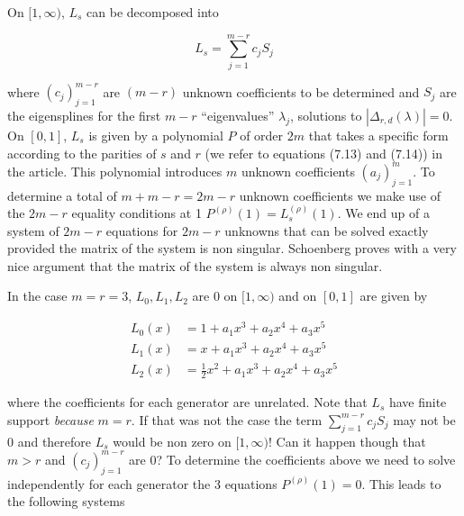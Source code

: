 \documentclass[a4paper, 11pt]{article}
\begin{document}
On $[1,\infty)$, $L_s$ can be decomposed into 

\begin{equation*}
  L_s = \sum_{j=1}^{m-r} c_j S_j
\end{equation*}

where $(c_j)_{j=1}^{m-r}$ are $(m-r)$ unknown coefficients to be determined and $S_j$ are the eigensplines for the first 
$m-r$ “eigenvalues” $\lambda_j$, solutions to $|\Delta_{r,d}(\lambda)|=0$. \\

On $[0,1]$, $L_s$ is given by a polynomial $P$ of order $2m$ that takes a specific form according to the parities of $s$ 
and $r$ (we refer to equations (7.13) and (7.14)) in the article. This polynomial introduces $m$ unknown coefficients 
$(a_j)_{j=1}^{m}$. To determine a total of $m + m-r = 2m-r$ unknown coefficients we make use of the $2m-r$ equality 
conditions at 1 $P^{(\rho)}(1) = L_s^{(\rho)}(1)$. We end up of a system of $2m-r$ equations for $2m-r$ unknowns that 
can be solved exactly provided the matrix of the system is non singular. Schoenberg proves with a very nice argument 
that the matrix of the system is always non singular. \\

\clearpage

In the case $m=r=3$, $L_0, L_1, L_2$ are 0 on $[1, \infty)$ and on $[0,1]$ are given by 

\begin{align}
  L_0(x) &= 1 + a_1 x^3 + a_2 x^4 + a_3 x^5 \\
  L_1(x) &= x + a_1 x^3 + a_2 x^4 + a_3 x^5 \\
  L_2(x) &= \frac{1}{2}x^2 + a_1 x^3 + a_2 x^4 + a_3 x^5
\end{align}

where the coefficients for each generator are unrelated. Note that $L_s$ have finite support \emph{because} $m=r$. If 
that was not the case the term $\displaystyle \sum_{j=1}^{m-r} c_j S_j$ may not be 0 and therefore $L_s$ would be non 
zero on $[1, \infty)$! Can it happen though that $m > r$ and $(c_j)_{j=1}^{m-r}$ are 0? To determine the coefficients 
above we need to solve independently for each generator the 3 equations $P^{(\rho)}(1) = 0$. This leads to the following 
systems
\end{document}
